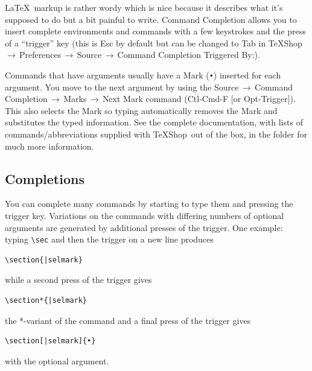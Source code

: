 \documentclass[letterpaper,11pt]{article}
\newcommand{\TS}{\textsf{\TeX Shop}}
\newcommand{\cmd}[1]{\textsf{#1}}
\newcommand{\mnu}[1]{\textsf{#1}}
\newcommand{\To}{\,\(\to\)\,}
\begin{document}
\LaTeX\ markup is rather wordy which is nice because it describes what it's supposed to do but a bit painful to write. Command Completion allows you to insert complete environments and commands with a few keystrokes and the press of a ``trigger'' key (this is \cmd{Esc} by default but can be changed to \cmd{Tab} in \mnu{TeXShop}\To\mnu{Preferences}\To\mnu{Source}\To\mnu{Command Completion Triggered By:}).

Commands that have arguments usually have a Mark (\texttt{•}) inserted for each argument. You move to the next argument by using the \mnu{Source}\To\mnu{Command Completion}\To\mnu{Marks}\To\mnu{Next Mark} command (\cmd{Ctl-Cmd-F} [or \cmd{Opt-Trigger}]). This also selects the Mark so typing automatically removes the Mark and substitutes the typed information. See the complete documentation, with lists of commands/abbreviations supplied with \TS\ out of the box, in the  folder for much more information.

\subsection{Completions}

You can complete many commands by starting to type them and pressing the trigger key. Variations on the commands with differing numbers of optional arguments are generated by additional presses of the trigger. One example: typing \verb|\sec| and then the trigger on a new line produces
\begin{verbatim}
\section{|selmark}
\end{verbatim}
while a second press of the trigger gives
\begin{verbatim}
\section*{|selmark}
\end{verbatim}
the *-variant of the command and a final press of the trigger gives
\begin{verbatim}
\section[|selmark]{•}
\end{verbatim}
with the optional argument.
\end{document}

